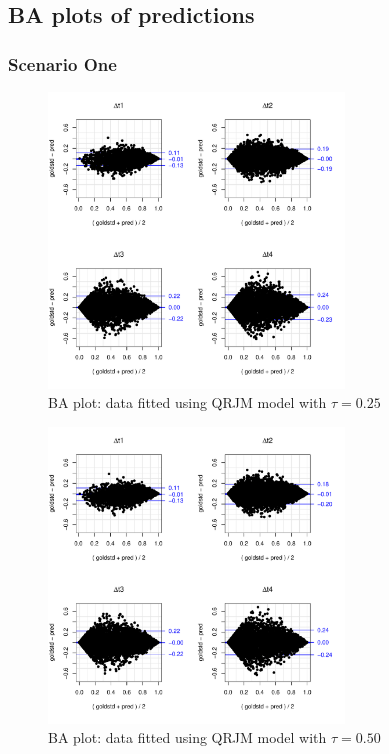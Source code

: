 \documentclass{article}
\begin{document}
\subsection{BA plots of predictions}

\subsubsection*{Scenario One}
\begin{figure}[H]
\centering
\includegraphics[width=0.7\textwidth]{qt25data_qt25pred_more.pdf}
\caption{BA plot: data fitted using QRJM model with $\tau=0.25$}
\end{figure}

\begin{figure}[H]
\centering
\includegraphics[width=0.7\textwidth]{qt25data_qt50pred_more.pdf}
\caption{BA plot: data fitted using QRJM model with $\tau=0.50$}
\end{figure}
\end{document}
